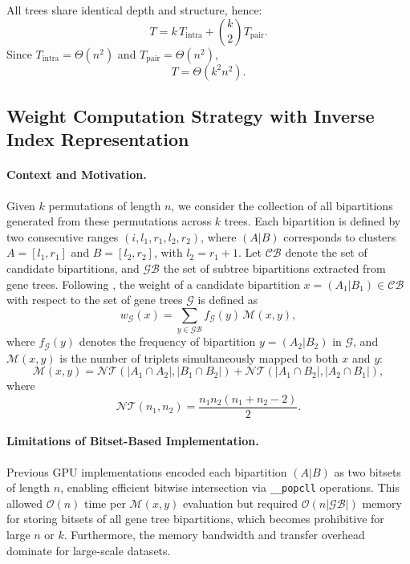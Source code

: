 \documentclass[11pt]{article}
\begin{document}
All trees share identical depth and structure, hence:
\[
T = k \, T_{\mathrm{intra}} + \binom{k}{2} T_{\mathrm{pair}}.
\]
Since $T_{\mathrm{intra}} = \Theta(n^2)$ and $T_{\mathrm{pair}} = \Theta(n^2)$,
\[
T = \Theta(k^2 n^2).
\]



\subsection{Weight Computation Strategy with Inverse Index Representation}

\paragraph{Context and Motivation.}
Given $k$ permutations of length $n$, we consider the collection of all
bipartitions generated from these permutations across $k$ trees. Each
bipartition is defined by two consecutive ranges $(i, l_1, r_1, l_2, r_2)$,
where $(A|B)$ corresponds to clusters $A = [l_1, r_1]$ and
$B = [l_2, r_2]$, with $l_2 = r_1 + 1$.  
Let $\mathcal{CB}$ denote the set of candidate bipartitions, and
$\mathcal{GB}$ the set of subtree bipartitions extracted from gene trees.
Following \cite{Islam-STELAR-2020}, the weight of a candidate bipartition
$x = (A_1|B_1) \in \mathcal{CB}$ with respect to the set of gene trees
$\mathcal{G}$ is defined as
\begin{equation}
w_{\mathcal{G}}(x) = \sum_{y \in \mathcal{GB}} f_{\mathcal{G}}(y)\,\mathcal{M}(x,y),
\label{eq:wg_def}
\end{equation}
where $f_{\mathcal{G}}(y)$ denotes the frequency of bipartition
$y = (A_2|B_2)$ in $\mathcal{G}$, and $\mathcal{M}(x,y)$ is the number of
triplets simultaneously mapped to both $x$ and $y$:
\begin{equation}
\mathcal{M}(x,y) = \mathcal{NT}(|A_1 \cap A_2|, |B_1 \cap B_2|)
+ \mathcal{NT}(|A_1 \cap B_2|, |A_2 \cap B_1|),
\label{eq:Mxy_new}
\end{equation}
where
\begin{equation}
\mathcal{NT}(n_1, n_2) = \frac{n_1 n_2 (n_1 + n_2 - 2)}{2}.
\label{eq:NT_new}
\end{equation}

\paragraph{Limitations of Bitset-Based Implementation.}
Previous GPU implementations encoded each bipartition $(A|B)$ as two bitsets
of length $n$, enabling efficient bitwise intersection via \texttt{\_\_popcll}
operations. This allowed $\mathcal{O}(n)$ time per $\mathcal{M}(x,y)$
evaluation but required $\mathcal{O}(n|\mathcal{GB}|)$ memory for storing
bitsets of all gene tree bipartitions, which becomes prohibitive for large
$n$ or $k$. Furthermore, the memory bandwidth and transfer overhead dominate
for large-scale datasets.
\end{document}
